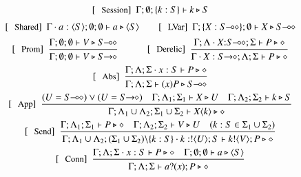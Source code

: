 \begin{figure}[!t]
\[
	\begin{array}{c}
		\trule{Session}~~\Gamma; \emptyset; \set{k:S} \proves k \hastype S 
		\\[2mm]
		\trule{Shared}~~\Gamma \cat a : \chtype{S}; \emptyset; \emptyset \proves a \hastype \chtype{S}
		\qquad
		\trule{LVar}~~\Gamma; \set{X: \lhot{S}}; \emptyset \proves X \hastype \lhot{S} 
		\\[2mm]
		\trule{Prom}~~\tree{
			\Gamma; \emptyset; \emptyset \proves V \hastype \lhot{S}
		}{
			\Gamma; \emptyset; \emptyset \proves V \hastype \shot{S}
		} 
		\qquad\quad  
		\trule{Derelic}~~\tree{
			\Gamma; \Lambda \cat X{:}\lhot{S}; \Sigma \proves P \hastype \Proc
		}{
			\Gamma \cat X:\shot{S}; \Lambda; \Sigma \proves P \hastype \Proc
		} 
		\\[4mm]

		\trule{Abs}~~\tree{
			\Gamma; \Lambda; \Sigma \cat x: S \proves P \hastype \Proc
		}{
			\Gamma; \Lambda; \Sigma \proves \abs{x}{P} \hastype \lhot{S}
		}
		\\[4mm]

		\trule{App}~~\tree{(U = \lhot{S}) \lor (U = \shot{S}) \quad \Gamma; \Lambda_1; \Sigma_1 \proves X \hastype U  \quad \Gamma; \Lambda_2; \Sigma_2 \proves k \hastype S
		}{
			\Gamma; \Lambda_1 \cup \Lambda_2; \Sigma_1 \cup \Sigma_2 \proves \appl{X}{k} \hastype \Proc
		} 
		\\[4mm]

		\trule{Send}~~\tree{
			\Gamma; \Lambda_1; \Sigma_1 \proves P \hastype \Proc  \quad \Gamma; \Lambda_2; \Sigma_2 \vdash V \hastype U  \quad (k:S \in \Sigma_1 \cup \Sigma_2)
		}{
			\Gamma; \Lambda_1 \cup \Lambda_2; (\Sigma_1 \cup \Sigma_2)\backslash\set{k:S} \cat k:\btout{U} S \proves \bout{k}{V} P \hastype \Proc
		}

		\\[4mm]
		\trule{Conn}~~\tree{
			\Gamma; \Lambda; \Sigma \cat x:S \proves P \hastype \Proc  \quad \Gamma; \emptyset; \emptyset \proves a \hastype \chtype{S}
		}{
			\Gamma; \Lambda; \Sigma \proves \binp{a}{x} P \hastype \Proc
		}
		\\[4mm]


\end{array}\]
\end{figure}
